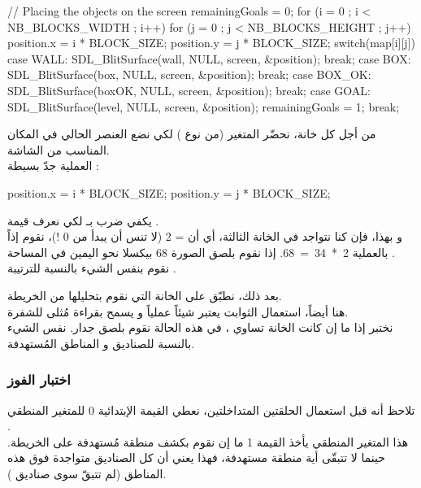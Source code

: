 \begin{Csource}
// Placing the objects on the screen
remainingGoals = 0;
for (i = 0 ; i < NB_BLOCKS_WIDTH ; i++)
{
	for (j = 0 ; j < NB_BLOCKS_HEIGHT ; j++)
	{
		position.x = i * BLOCK_SIZE;
		position.y = j * BLOCK_SIZE;
		switch(map[i][j])
		{
			case WALL:
			SDL_BlitSurface(wall, NULL, screen, &position);
			break;
			case BOX:
			SDL_BlitSurface(box, NULL, screen, &position);
			break;
			case BOX_OK:
			SDL_BlitSurface(boxOK, NULL, screen, &position);
			break;
			case GOAL:
			SDL_BlitSurface(level, NULL, screen, &position);
			remainingGoals = 1;
			break;
		}
	}
}
\end{Csource}

من أجل كل خانة، نحضّر المتغير
(من نوع
)
لكي نضع العنصر الحالي في المكان المناسب من الشاشة.\\
العملية جدّ بسيطة :

\begin{Csource}
position.x = i * BLOCK_SIZE;
position.y = j * BLOCK_SIZE;
\end{Csource}

يكفي ضرب
بـ
لكي نعرف قيمة
.\\
و بهذا، فإن كنا نتواجد في الخانة الثالثة، أي أن
 = 2
(لا تنس أن
يبدأ من 0 !)، نقوم إذاً بالعملية
\mbox{2 * 34 = 68}.
 إذا نقوم بلصق الصورة 68 بيكسلا نحو اليمين في المساحة 
.\\
نقوم بنفس الشيء بالنسبة للترتيبة
.

بعد ذلك، نطبّق
على الخانة التي نقوم بتحليلها من الخريطة.\\
هنا أيضاً، استعمال الثوابت يعتبر شيئاً عملياً و يسمح بقراءة مُثلى للشفرة.\\
نختبر إذا ما إن كانت الخانة تساوي
،
في هذه الحالة نقوم بلصق جدار. نفس الشيء بالنسبة للصناديق و المناطق المُستهدفة.

\subsubsection{اختبار الفوز}

تلاحظ أنه قبل استعمال الحلقتين المتداخلتين، نعطي القيمة الإبتدائية 0 للمتغير المنطقي
.\\
هذا المتغير المنطقي يأخذ القيمة 1 ما إن نقوم بكشف منطقة مُستهدفة على الخريطة. حينما لا تتبقّى أية منطقة مستهدفة، فهذا يعني أن كل الصناديق متواجدة فوق هذه المناطق (لم تتبقّ سوى صناديق
).

